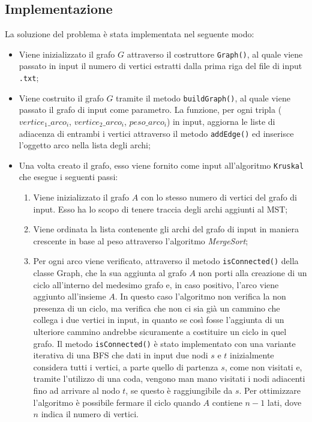 \subsection{Implementazione}
	La soluzione del problema è stata implementata nel seguente modo:
	\begin{itemize}
		\item Viene inizializzato il grafo $G$ attraverso il costruttore \texttt{Graph()}, al quale viene passato in input il numero di vertici estratti dalla prima riga del file di input \texttt{.txt};
		\item Viene costruito il grafo $G$ tramite il metodo \texttt{buildGraph()}, al quale viene passato il grafo di input come parametro. 
		La funzione, per ogni tripla ($vertice_1\_arco_i$, $vertice_2\_arco_i$, $peso\_arco_i$) in input, aggiorna le liste di adiacenza di entrambi i vertici attraverso il metodo \texttt{addEdge()} ed inserisce l'oggetto arco nella lista degli archi; 
		\item Una volta creato il grafo, esso viene fornito come input all'algoritmo \texttt{Kruskal} che esegue i seguenti passi:
		\begin{enumerate}
			\item Viene inizializzato il grafo $A$ con lo stesso numero di vertici del grafo di input. 
			Esso ha lo scopo di tenere traccia degli archi aggiunti al MST;
			\item Viene ordinata la lista contenente gli archi del grafo di input in maniera crescente in base al peso attraverso l'algoritmo \textit{MergeSort};
			\item Per ogni arco viene verificato, attraverso il metodo \texttt{isConnected()} della classe Graph, che la sua aggiunta al grafo $A$ non porti alla creazione di un ciclo all'interno del medesimo grafo e, in caso positivo, l'arco viene aggiunto all'insieme $A$. 
			In questo caso l'algoritmo non verifica la non presenza di un ciclo, ma verifica che non ci sia già un cammino che collega i due vertici in input, in quanto se così fosse l'aggiunta di un ulteriore cammino andrebbe sicuramente a costituire un ciclo in quel grafo. 
			Il metodo \texttt{isConnected()} è stato implementato con una variante iterativa di una BFS che dati in input due nodi $s$ e $t$ inizialmente considera tutti i vertici, a parte quello di partenza $s$, come non visitati e, tramite l'utilizzo di una coda, vengono man mano visitati i nodi adiacenti fino ad arrivare al nodo $t$, se questo è raggiungibile da $s$. 
			Per ottimizzare l'algoritmo è possibile fermare il ciclo quando $A$ contiene $n-1$ lati, dove $n$ indica il numero di vertici.
		\end{enumerate}
	\end{itemize}

